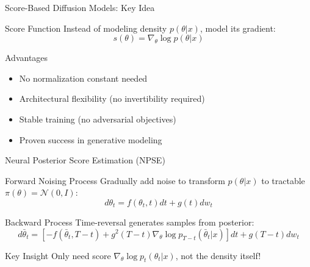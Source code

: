 \documentclass{beamer}
\begin{document}
\begin{frame}{Score-Based Diffusion Models: Key Idea}

\begin{block}{Score Function}
Instead of modeling density $p(\theta|x)$, model its gradient:
\begin{equation*}
s(\theta) = \nabla_\theta \log p(\theta|x)
\end{equation*}
\end{block}

\begin{block}{Advantages}
\begin{itemize}
    \item No normalization constant needed
    \item Architectural flexibility (no invertibility required)
    \item Stable training (no adversarial objectives)
    \item Proven success in generative modeling
\end{itemize}
\end{block}

\end{frame}

\begin{frame}{Neural Posterior Score Estimation (NPSE)}

\begin{block}{Forward Noising Process}
Gradually add noise to transform $p(\theta|x)$ to tractable $\pi(\theta) = \mathcal{N}(0,I)$:
\begin{equation*}
d\theta_t = f(\theta_t, t)dt + g(t)dw_t
\end{equation*}
\end{block}

\begin{block}{Backward Process}
Time-reversal generates samples from posterior:
\begin{equation*}
d\bar{\theta}_t = \left[-f(\bar{\theta}_t, T-t) + g^2(T-t)\nabla_\theta \log p_{T-t}(\bar{\theta}_t|x)\right]dt + g(T-t)dw_t
\end{equation*}
\end{block}

\begin{block}{Key Insight}
Only need score $\nabla_\theta \log p_t(\theta_t|x)$, not the density itself!
\end{block}

\end{frame}
\end{document}
